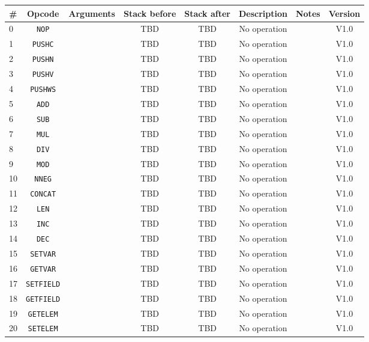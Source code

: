 \documentclass{article}
\begin{document}
\begin{longtable}{|l|c|c|c|c|c|c|c|}
		\hline
		\# & Opcode & Arguments & Stack before & Stack after & Description & Notes & Version \\ \hline
		0 & \texttt{NOP} & & TBD & TBD & No operation & & \textsf{V1.0} \\ \hline
		1 & \texttt{PUSHC} & & TBD & TBD & No operation & & \textsf{V1.0} \\ \hline
		2 & \texttt{PUSHN} & & TBD & TBD & No operation & & \textsf{V1.0} \\ \hline
		3 & \texttt{PUSHV} & & TBD & TBD & No operation & & \textsf{V1.0} \\ \hline
		4 & \texttt{PUSHWS} & & TBD & TBD & No operation & & \textsf{V1.0} \\ \hline
		5 & \texttt{ADD} & & TBD & TBD & No operation & & \textsf{V1.0} \\ \hline
		6 & \texttt{SUB} & & TBD & TBD & No operation & & \textsf{V1.0} \\ \hline
		7 & \texttt{MUL} & & TBD & TBD & No operation & & \textsf{V1.0} \\ \hline
		8 & \texttt{DIV} & & TBD & TBD & No operation & & \textsf{V1.0} \\ \hline
		9 & \texttt{MOD} & & TBD & TBD & No operation & & \textsf{V1.0} \\ \hline
		10 & \texttt{NNEG} & & TBD & TBD & No operation & & \textsf{V1.0} \\ \hline
		11 & \texttt{CONCAT} & & TBD & TBD & No operation & & \textsf{V1.0} \\ \hline
		12 & \texttt{LEN} & & TBD & TBD & No operation & & \textsf{V1.0} \\ \hline
		13 & \texttt{INC} & & TBD & TBD & No operation & & \textsf{V1.0} \\ \hline
		14 & \texttt{DEC} & & TBD & TBD & No operation & & \textsf{V1.0} \\ \hline
		15 & \texttt{SETVAR} & & TBD & TBD & No operation & & \textsf{V1.0} \\ \hline
		16 & \texttt{GETVAR} & & TBD & TBD & No operation & & \textsf{V1.0} \\ \hline
		17 & \texttt{SETFIELD} & & TBD & TBD & No operation & & \textsf{V1.0} \\ \hline
		18 & \texttt{GETFIELD} & & TBD & TBD & No operation & & \textsf{V1.0} \\ \hline
		19 & \texttt{GETELEM} & & TBD & TBD & No operation & & \textsf{V1.0} \\ \hline
		20 & \texttt{SETELEM} & & TBD & TBD & No operation & & \textsf{V1.0} \\ \hline

\end{longtable}
\end{document}
